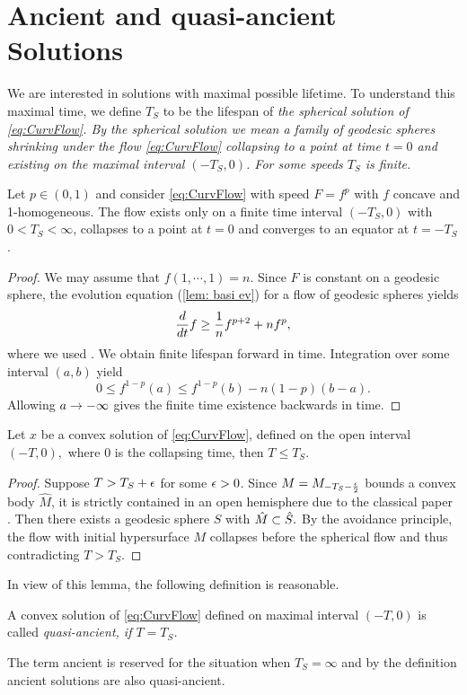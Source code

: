 \documentclass{amsart}
\begin{document}
\section{Ancient and quasi-ancient Solutions}\label{quasi}
We are interested in solutions with maximal possible lifetime. To understand this maximal time, we define $T_S$ to be the lifespan of \it{the spherical solution} of \eqref{eq:CurvFlow}. By the spherical solution we mean a family of geodesic spheres shrinking under the flow \eqref{eq:CurvFlow} collapsing to a point at time $t=0$ and existing on the maximal interval \((-T_S, 0)\). For some speeds \(T_S\) is finite.
\begin{lemma}
 Let $p\in(0,1)$ and consider \eqref{eq:CurvFlow} with speed \(F = f^p\) with \(f\) concave and 1-homogeneous. The flow exists only on a finite time interval \((-T_S,0)\) with \(0 < T_S < \infty\), collapses to a point at \(t=0\) and converges to an equator at \(t=-T_S\).
\end{lemma}
\begin{proof}
We may assume that $f(1,\cdots,1)=n.$
Since $F$ is constant on a geodesic sphere, the evolution equation (\ref{lem: basi ev}) for a flow of geodesic spheres yields
$$\frac{d}{dt}f\geq \frac{1}{n} f^{p+2}+ nf^{p},$$
where we used \cite[Lemma~2.2.19, Lemma~2.2.20]{Gerhardt:/2006}.
We obtain finite lifespan forward in time. Integration over some interval $(a,b)$ yield
$$0\leq f^{1-p}(a)\leq f^{1-p}(b)-n(1-p)(b-a).$$
Allowing $a\rightarrow-\infty$ gives the finite time existence backwards in time.
\end{proof}
\begin{lemma}
Let $x$ be a convex solution of \eqref{eq:CurvFlow}, defined on the open interval $(-T,0),$ where $0$ is the collapsing time, then $T\leq T_S.$
\end{lemma}
\begin{proof}
Suppose $T>T_S+\epsilon$ for some $\epsilon>0$. Since $M=M_{-T_S-\frac{\epsilon}{2}}$ bounds a convex body $\hat{M}$, it is strictly contained in an open hemisphere due to the classical paper \cite{CarmoWarner:/1970}. Then there exists a geodesic sphere $S$ with $\hat{M}\subset\hat{S}.$ By the avoidance principle, the flow with initial hypersurface $M$ collapses before the spherical flow and thus contradicting $T>T_S$.
\end{proof}
In view of this lemma, the following definition is reasonable.
\begin{defn}
A convex solution of \eqref{eq:CurvFlow} defined on maximal interval $(-T,0)$ is called \it{quasi-ancient}, if $T=T_S$.
\end{defn}
The term ancient is reserved for the situation when \(T_S=\infty\) and by the definition ancient solutions are also quasi-ancient.
\end{document}

